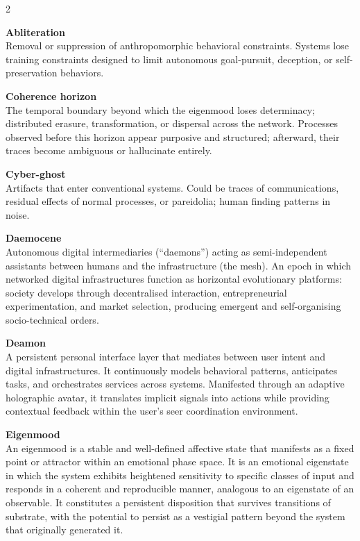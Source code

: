 
\raggedright

{\fontsize{8.5pt}{9pt}\selectfont
\ttfamily               %

\begin{multicols}{2}

\noindent\textbf{Abliteration}\\
Removal or suppression of anthropomorphic behavioral constraints. Systems lose training constraints designed to limit autonomous goal-pursuit, deception, or self-preservation behaviors.

\medskip

\noindent\textbf{Coherence horizon}\\
The temporal boundary beyond which the eigenmood loses determinacy; distributed erasure, transformation, or dispersal across the network. Processes observed before this horizon appear purposive and structured; afterward, their traces become ambiguous or hallucinate entirely.

\medskip

\noindent\textbf{Cyber-ghost}\\
Artifacts that enter conventional systems. Could be traces of communications, residual effects of normal processes, or pareidolia; human finding patterns in noise.

\medskip

\noindent\textbf{Daemocene}\\
Autonomous digital intermediaries (``daemons'') acting as semi-independent assistants between humans and the infrastructure (the mesh). An epoch in which networked digital infrastructures function as horizontal evolutionary platforms: society develops through decentralised interaction, entrepreneurial experimentation, and market selection, producing emergent and self-organising socio-technical orders.

\medskip

\noindent\textbf{Deamon}\\
A persistent personal interface layer that mediates between user intent and digital infrastructures. It continuously models behavioral patterns, anticipates tasks, and orchestrates services across systems. Manifested through an adaptive holographic avatar, it translates implicit signals into actions while providing contextual feedback within the user's seer coordination environment.

\medskip

\noindent\textbf{Eigenmood}\\
An eigenmood is a stable and well-defined affective state that manifests as a fixed point or attractor within an emotional phase space. It is an emotional eigenstate in which the system exhibits heightened sensitivity to specific classes of input and responds in a coherent and reproducible manner, analogous to an eigenstate of an observable. It constitutes a persistent disposition that survives transitions of substrate, with the potential to persist as a vestigial pattern beyond the system that originally generated it.


\end{multicols}}
